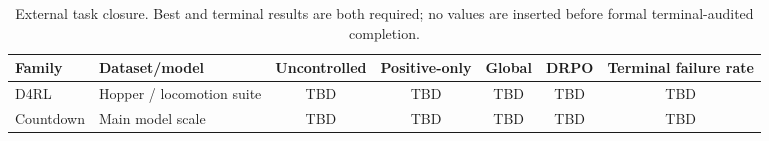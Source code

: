 \begin{table}[t]
\centering
\caption{External task closure. Best and terminal results are both required; no values are inserted before formal terminal-audited completion.}
\label{tab:external_results}
\small
\begin{tabular}{llccccc}
\toprule
Family & Dataset/model & Uncontrolled & Positive-only & Global & DRPO & Terminal failure rate \\
\midrule
D4RL & Hopper / locomotion suite & TBD & TBD & TBD & TBD & TBD \\
Countdown & Main model scale & TBD & TBD & TBD & TBD & TBD \\
\bottomrule
\end{tabular}
\end{table}
